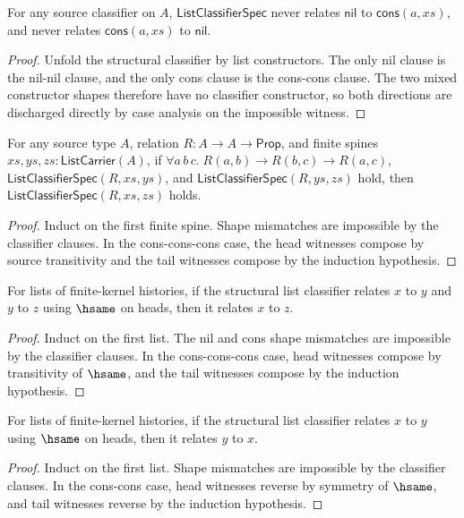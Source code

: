 \begin{lemma}
\label{lem:list-classifier-nil-cons-no-confusion}
For any source classifier on $A$, $\mathsf{ListClassifierSpec}$ never relates
$\mathsf{nil}$ to $\mathsf{cons}(a,xs)$, and never relates
$\mathsf{cons}(a,xs)$ to $\mathsf{nil}$.
\end{lemma}
\begin{proof}
Unfold the structural classifier by list constructors. The only nil clause is
the nil-nil clause, and the only cons clause is the cons-cons clause. The two
mixed constructor shapes therefore have no classifier constructor, so both
directions are discharged directly by case analysis on the impossible witness.
\end{proof}

\begin{theorem}
\label{thm:list-classifier-transitivity}
For any source type $A$, relation $R:A\to A\to\mathsf{Prop}$, and finite spines $xs,ys,zs:\mathsf{ListCarrier}(A)$, if
$\forall a\,b\,c.\;R(a,b)\to R(b,c)\to R(a,c)$,
$\mathsf{ListClassifierSpec}(R,xs,ys)$, and
$\mathsf{ListClassifierSpec}(R,ys,zs)$ hold, then
$\mathsf{ListClassifierSpec}(R,xs,zs)$ holds.
\end{theorem}
\begin{proof}
Induct on the first finite spine. Shape mismatches are impossible by the classifier clauses. In the cons-cons-cons case, the head witnesses compose by source transitivity and the tail witnesses compose by the induction hypothesis.
\end{proof}

\begin{theorem}
\label{thm:list-classifier-hsame-trans}
For lists of finite-kernel histories, if the structural list classifier relates \(x\) to \(y\) and \(y\) to \(z\) using \(\hsame\) on heads, then it relates \(x\) to \(z\).
\end{theorem}
\begin{proof}
Induct on the first list. The nil and cons shape mismatches are impossible by the classifier clauses. In the cons-cons-cons case, head witnesses compose by transitivity of \(\hsame\), and the tail witnesses compose by the induction hypothesis.
\end{proof}

\begin{theorem}
\label{thm:list-classifier-hsame-symm}
For lists of finite-kernel histories, if the structural list classifier relates \(x\) to \(y\) using \(\hsame\) on heads, then it relates \(y\) to \(x\).
\end{theorem}
\begin{proof}
Induct on the first list. Shape mismatches are impossible by the classifier clauses. In the cons-cons case, head witnesses reverse by symmetry of \(\hsame\), and tail witnesses reverse by the induction hypothesis.
\end{proof}

